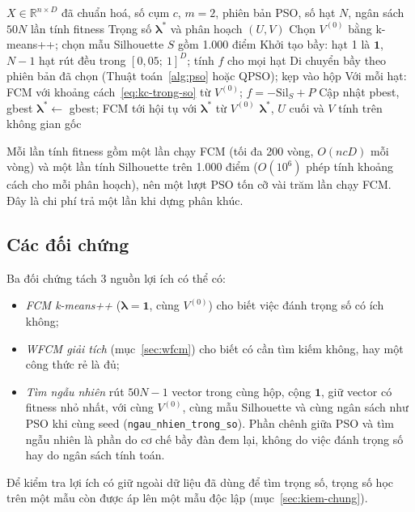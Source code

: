 \begin{algorithm}[htbp]
\caption{PSO tìm trọng số thuộc tính cho FCM (\texttt{pso\_trong\_so.py})}
\label{alg:pso-trong-so}
\begin{algorithmic}[1]
\REQUIRE $X \in \mathbb{R}^{n \times D}$ đã chuẩn hoá, số cụm $c$, $m = 2$, phiên bản PSO, số hạt $N$, ngân sách $50N$ lần tính fitness
\ENSURE Trọng số $\symbf{\lambda}^{*}$ và phân hoạch $(U, V)$
\STATE Chọn $V^{(0)}$ bằng k-means++; chọn mẫu Silhouette $S$ gồm 1.000 điểm
\STATE Khởi tạo bầy: hạt 1 là $\mathbf{1}$, $N - 1$ hạt rút đều trong $[0{,}05;\ 1]^D$; tính $f$ cho mọi hạt
  \STATE Di chuyển bầy theo phiên bản đã chọn (Thuật toán~\ref{alg:pso} hoặc QPSO); kẹp vào hộp
  \STATE Với mỗi hạt: FCM với khoảng cách~\eqref{eq:kc-trong-so} từ $V^{(0)}$; $f = -\mathrm{Sil}_S + P$
  \STATE Cập nhật pbest, gbest
\ENDFOR
\STATE $\symbf{\lambda}^{*} \leftarrow$ gbest; FCM tới hội tụ với $\symbf{\lambda}^{*}$ từ $V^{(0)}$
\RETURN $\symbf{\lambda}^{*}$, $U$ cuối và $V$ tính trên không gian gốc
\end{algorithmic}
\end{algorithm}

Mỗi lần tính fitness gồm một lần chạy FCM (tối đa 200 vòng, $O(ncD)$ mỗi vòng) và một lần tính Silhouette trên 1.000 điểm
($O(10^6)$ phép tính khoảng cách cho mỗi phân hoạch), nên một lượt PSO tốn cỡ vài trăm lần chạy FCM. Đây là chi phí trả một
lần khi dựng phân khúc.

\subsection{Các đối chứng}

Ba đối chứng tách 3 nguồn lợi ích có thể có:
\begin{itemize}
\item \emph{FCM k-means++} ($\symbf{\lambda} = \mathbf{1}$, cùng $V^{(0)}$) cho biết việc đánh trọng số có ích không;
\item \emph{WFCM giải tích} (mục~\ref{sec:wfcm}) cho biết có cần tìm kiếm không, hay một công thức rẻ là đủ;
\item \emph{Tìm ngẫu nhiên} rút $50N - 1$ vector trong cùng hộp, cộng $\mathbf{1}$, giữ vector có fitness nhỏ nhất, với cùng
$V^{(0)}$, cùng mẫu Silhouette và cùng ngân sách như PSO khi cùng seed (\texttt{ngau\_nhien\_trong\_so}). Phần chênh giữa PSO
và tìm ngẫu nhiên là phần do cơ chế bầy đàn đem lại, không do việc đánh trọng số hay do ngân sách tính toán.
\end{itemize}
Để kiểm tra lợi ích có giữ ngoài dữ liệu đã dùng để tìm trọng số, trọng số học trên một mẫu còn được áp lên một mẫu độc lập
(mục~\ref{sec:kiem-chung}).

